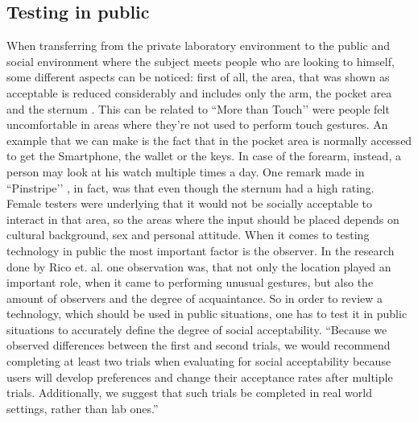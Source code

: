 \documentclass{sigchi}
\begin{document}
\subsection{Testing in public}
%
When transferring from the private laboratory environment to the public and social environment where the subject meets people who are looking to himself, some different aspects can be noticed: first of all, the area, that was shown as acceptable is reduced considerably and includes only the arm, the pocket area and the sternum \cite{pinstripe}. This can be related to ``More than Touch’’  \cite{more-touch} were people felt uncomfortable in areas where they’re not used to perform touch gestures. An example that we can make is the fact that in the pocket area is normally accessed to get the Smartphone, the wallet or the keys. In case of the forearm, instead, a person may look at his watch multiple times a day. One remark made in ``Pinstripe’’ \cite{pinstripe}, in fact, was that even though the sternum had a high rating. Female testers were underlying that it would not be socially acceptable to interact in that area, so the areas where the input should be placed depends on cultural background, sex and personal attitude.
When it comes to testing technology in public the most important factor is the observer. In the research done by Rico et. al. \cite{usable-gesture} one observation was, that not only the location played an important role, when it came to performing unusual gestures, but also the amount of observers and the degree of acquaintance. So in order to review a technology, which should be used in public situations, one has to test it in public situations to accurately define the degree of social acceptability.
“Because we observed differences between the first and second trials, we would recommend completing at least two trials when evaluating for social acceptability because users will develop preferences and change their acceptance rates after multiple trials. Additionally, we suggest that such trials be completed in real world settings, rather than lab ones.” \cite[p. 9]{usable-gesture}%
\end{document}
